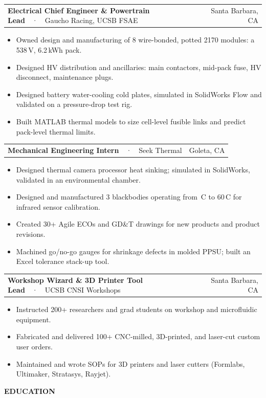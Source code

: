 \documentclass[10pt,letterpaper]{article}
\makeatletter
\renewcommand{\section}[1]{%
  \vspace{6pt}%
  {\color{redline}\ttfamily\footnotesize\bfseries\MakeUppercase{#1}}%
  \hspace{6pt}{\color{muted}\leaders\hrule height 0.4pt\hfill}\par
  \vspace{6pt}}
\newcommand{\job}[4]{%
  \begin{tabularx}{\linewidth}{@{}X r@{}}
    \textbf{#1}\ \ {\color{muted}·}\ \ #2 &
    {\small\color{muted}#3}\quad{\ttfamily\small\leavevmode\color{muted}#4} \\
  \end{tabularx}\par\vspace{1pt}}
\makeatother
\begin{document}
\job{Electrical Chief Engineer \& Powertrain Lead}{Gaucho Racing, UCSB FSAE}{Santa Barbara, CA}{Nov 2021 \textendash\ Jun 2025}
\begin{itemize}
  \item Owned design and manufacturing of 8 wire-bonded, potted 2170 modules: a 538\,V, 6.2\,kWh pack.
  \item Designed HV distribution and ancillaries: main contactors, mid-pack fuse, HV disconnect, maintenance plugs.
  \item Designed battery water-cooling cold plates, simulated in SolidWorks Flow and validated on a pressure-drop test rig.
  \item Built MATLAB thermal models to size cell-level fusible links and predict pack-level thermal limits.
\end{itemize}

\job{Mechanical Engineering Intern}{Seek Thermal}{Goleta, CA}{Jun 2023 \textendash\ Oct 2023}
\begin{itemize}
  \item Designed thermal camera processor heat sinking; simulated in SolidWorks, validated in an environmental chamber.
  \item Designed and manufactured 3 blackbodies operating from \,\textdegree C to 60\,\textdegree C for infrared sensor calibration.
  \item Created 30+ Agile ECOs and GD\&T drawings for new products and product revisions.
  \item Machined go/no-go gauges for shrinkage defects in molded PPSU; built an Excel tolerance stack-up tool.
\end{itemize}

\job{Workshop Wizard \& 3D Printer Tool Lead}{UCSB CNSI Workshops}{Santa Barbara, CA}{Jun 2022 \textendash\ Present}
\begin{itemize}
  \item Instructed 200+ researchers and grad students on workshop and microfluidic equipment.
  \item Fabricated and delivered 100+ CNC-milled, 3D-printed, and laser-cut custom user orders.
  \item Maintained and wrote SOPs for 3D printers and laser cutters (Formlabs, Ultimaker, Stratasys, Rayjet).
\end{itemize}


\section{Education}
\end{document}
